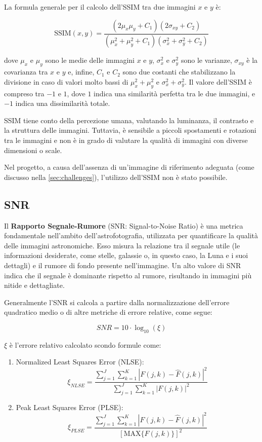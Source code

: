 La formula generale per il calcolo dell'SSIM tra due immagini $x$ e $y$ è:

$$
\text{SSIM}(x, y) = \frac{(2\mu_x\mu_y + C_1)(2\sigma_{xy} + C_2)}{(\mu_x^2 + \mu_y^2 + C_1)(\sigma_x^2 + \sigma_y^2 + C_2)}
$$

dove $\mu_x$ e $\mu_y$ sono le medie delle immagini $x$ e $y$, $\sigma_x^2$ e $\sigma_y^2$ sono le varianze, $\sigma_{xy}$ è la covarianza tra $x$ e $y$ e, infine, $C_1$ e $C_2$ sono due costanti che stabilizzano la divisione in caso di valori molto bassi di $\mu_x^2 + \mu_y^2$ e $\sigma_x^2 + \sigma_y^2$. Il valore dell'SSIM è compreso tra $-1$ e $1$, dove $1$ indica una similarità perfetta tra le due immagini, e $-1$ indica una dissimilarità totale.

SSIM tiene conto della percezione umana, valutando la luminanza, il contrasto e la struttura delle immagini. Tuttavia, è sensibile a piccoli spostamenti e rotazioni tra le immagini e non è in grado di valutare la qualità di immagini con diverse dimensioni o scale.

Nel progetto, a causa dell'assenza di un'immagine di riferimento adeguata (come discusso nella \cref{sec:challenges}), l'utilizzo dell'SSIM non è stato possibile.

\subsection{SNR} \label{subsec:snr}

Il \textbf{Rapporto Segnale-Rumore} (SNR: Signal-to-Noise Ratio) è una metrica fondamentale nell'ambito dell'astrofotografia, utilizzata per quantificare la qualità delle immagini astronomiche. Esso misura la relazione tra il segnale utile (le informazioni desiderate, come stelle, galassie o, in questo caso, la Luna e i suoi dettagli) e il rumore di fondo presente nell'immagine. Un alto valore di SNR indica che il segnale è dominante rispetto al rumore, risultando in immagini più nitide e dettagliate. 

Generalmente l'SNR si calcola a partire dalla normalizzazione dell'errore quadratico medio o di altre metriche di errore relative, come segue:

$$
SNR = 10 \cdot \log_{10} (\xi)
$$

$\xi$ è l'errore relativo calcolato scondo formule come:

\begin{enumerate}
    \item Normalized Least Squares Error (NLSE):
    $$
    \xi_{NLSE} = \dfrac{\sum_{j = 1}^J \sum_{k=1}^K |F(j, k) - \hat F(j, k)|^2}
    {\sum_{j = 1}^J \sum_{k=1}^K |F(j, k)|^2}
    $$

    \item Peak Least Squares Error (PLSE):
    $$
    \xi_{PLSE} = \dfrac{\sum_{j = 1}^J \sum_{k=1}^K |F(j, k) - \hat F(j, k)|^2}
    {[\text{MAX}\{F(j, k)\}]^2}
    $$
\end{enumerate}

